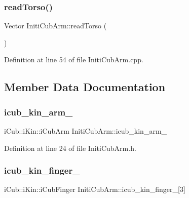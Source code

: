 \subsubsection{\texorpdfstring{read\+Torso()}{readTorso()}}
{\footnotesize\ttfamily Vector Initi\+Cub\+Arm\+::read\+Torso (\begin{DoxyParamCaption}{ }\end{DoxyParamCaption})\hspace{0.3cm}{\ttfamily [private]}}



Definition at line 54 of file Initi\+Cub\+Arm.\+cpp.



\subsection{Member Data Documentation}
\mbox{\label{classInitiCubArm_ae91a23c5ca3112d9a18561844ac0413b}} 
\subsubsection{\texorpdfstring{icub\+\_\+kin\+\_\+arm\+\_\+}{icub\_kin\_arm\_}}
{\footnotesize\ttfamily i\+Cub\+::i\+Kin\+::i\+Cub\+Arm Initi\+Cub\+Arm\+::icub\+\_\+kin\+\_\+arm\+\_\+\hspace{0.3cm}{\ttfamily [private]}}



Definition at line 24 of file Initi\+Cub\+Arm.\+h.

\mbox{\label{classInitiCubArm_a6fb2f21dcfe50b9d28bb58bc90c93f36}} 
\subsubsection{\texorpdfstring{icub\+\_\+kin\+\_\+finger\+\_\+}{icub\_kin\_finger\_}}
{\footnotesize\ttfamily i\+Cub\+::i\+Kin\+::i\+Cub\+Finger Initi\+Cub\+Arm\+::icub\+\_\+kin\+\_\+finger\+\_\+\mbox{[}3\mbox{]}\hspace{0.3cm}{\ttfamily [private]}}



